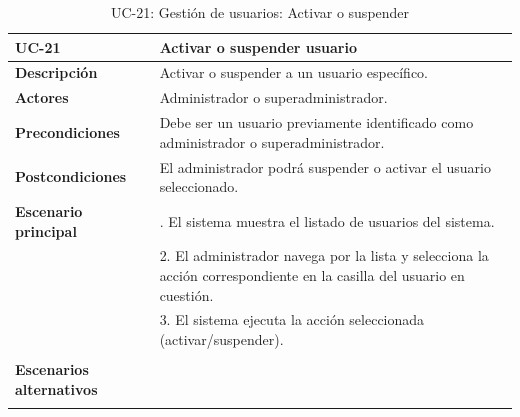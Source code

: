 \begin{table}
  \begin{center}
    \begin{tabularx}{16.4cm}{|l|X|}
      \hline
      \textbf{UC-21} & \textbf{Activar o suspender usuario}\\
      \hline
      \textbf{Descripción} & Activar o suspender a un usuario específico.\\
      \hline
      \textbf{Actores} & Administrador o superadministrador.\\
      \hline
      \textbf{Precondiciones} & Debe ser un usuario previamente identificado como administrador o superadministrador.\\
      \hline
      \textbf{Postcondiciones} & El administrador podrá suspender o activar el usuario seleccionado.\\
      \hline
      \textbf{Escenario principal} & \smallskip 1. El sistema muestra el listado de usuarios del sistema.\\
      & 2. El administrador navega por la lista y selecciona la acción correspondiente en la casilla del usuario en cuestión.\\
      & 3. El sistema ejecuta la acción seleccionada (activar/suspender).\\
      & \\
      \hline
      \textbf{Escenarios alternativos} & \\
      & \\
      \hline
    \end{tabularx}
    \caption{UC-21: Gestión de usuarios: Activar o suspender}
    \label{tab:CU-activar-suspender-usuario}
  \end{center}
\end{table}


